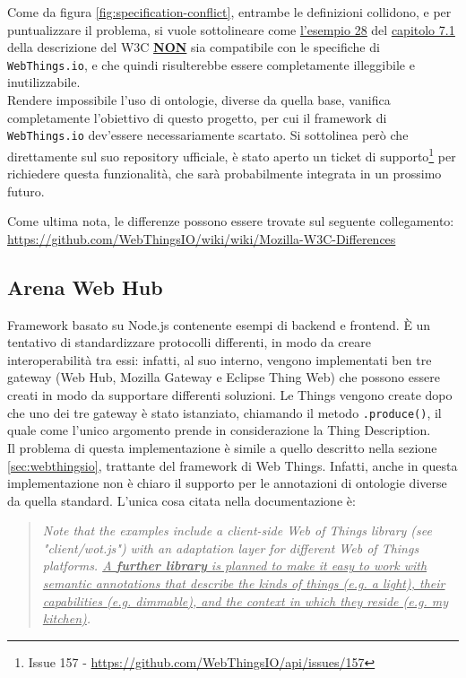 \documentclass[12pt,a4paper,openright,oneside]{report}
\begin{document}
Come da figura \ref{fig:specification-conflict}, entrambe le definizioni collidono, e per puntualizzare il problema, si vuole sottolineare come \href{https://www.w3.org/TR/wot-thing-description/#example-28}{\ul{l'esempio 28}} del \href{https://www.w3.org/TR/wot-thing-description/#semantic-annotations}{\ul{capitolo 7.1}} della descrizione del W3C \textbf{\uline{NON}} sia compatibile con le specifiche di \texttt{WebThings.io}, e che quindi risulterebbe essere completamente illeggibile e inutilizzabile.\\

Rendere impossibile l'uso di ontologie, diverse da quella base, vanifica completamente l'obiettivo di questo progetto, per cui il framework di \texttt{WebThings.io} dev'essere necessariamente scartato. Si sottolinea però che direttamente sul suo repository ufficiale, è stato aperto un ticket di supporto\footnote{Issue 157 - \url{https://github.com/WebThingsIO/api/issues/157}} per richiedere questa funzionalità, che sarà probabilmente integrata in un prossimo futuro.

Come ultima nota, le differenze possono essere trovate sul seguente collegamento: \url{https://github.com/WebThingsIO/wiki/wiki/Mozilla-W3C-Differences}


\subsection{Arena Web Hub}
Framework \cite{arenawh} basato su Node.js contenente esempi di backend e frontend. È un tentativo di standardizzare protocolli differenti, in modo da creare interoperabilità tra essi: infatti, al suo interno, vengono implementati ben tre gateway (Web Hub, Mozilla Gateway e Eclipse Thing Web) che possono essere creati in modo da supportare differenti soluzioni. Le Things vengono create dopo che uno dei tre gateway è stato istanziato, chiamando il metodo \texttt{.produce()}, il quale come l'unico argomento prende in considerazione la Thing Description.\\

Il problema di questa implementazione è simile a quello descritto nella sezione \ref{sec:webthingsio}, trattante del framework di Web Things. Infatti, anche in questa implementazione non è chiaro il supporto per le annotazioni di ontologie diverse da quella standard. L'unica cosa citata nella documentazione è:

\begin{quote}
\textit{Note that the examples include a client-side Web of Things library (see "client/wot.js") with an adaptation layer for different Web of Things platforms. \ul{A \textbf{further library} is planned to make it easy to work with semantic annotations that describe the kinds of things (e.g. a light), their capabilities (e.g. dimmable), and the context in which they reside (e.g. my kitchen)}.}
\end{quote}
\end{document}
